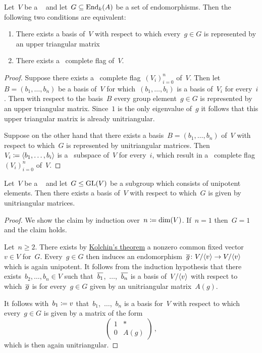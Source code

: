 \begin{lemma}
  Let~$V$ be a {\fd}~{\kvs} and let~$G \subseteq \operatorname{End}_k(A)$ be a set of endomorphisms. 
  Then the following two conditions are equivalent:
  \begin{enumerate}
    \item 
      There exists a basis of~$V$ with respect to which every~$g \in G$ is represented by an upper triangular matrix 
    \item
      There exists a~ complete flag of~$V$.
  \end{enumerate} 
\end{lemma}


\begin{proof}
  Suppose there exists a~ complete flag~$(V_i)_{i=0}^n$ of~$V$.
  Then let~$B = (b_1, \dotsc, b_n)$ be a basis of~$V$ for which~$(b_1, \dotsc, b_i)$ is a basis of~$V_i$ for every~$i$.
  Then with respect to the basis~$B$ every group element~$g \in G$ is represented by an upper triangular matrix.
  Since~$1$ is the only eigenvalue of~$g$ it follows that this upper triangular matrix is already unitriangular.
  
  Suppose on the other hand that there exists a basis~$B = (b_1, \dotsc, b_n)$ of~$V$ with respect to which~$G$ is represented by unitriangular matrices.
  Then~$V_i \coloneqq \langle b_1, \dotsc, b_i\rangle$ is a~ subspace of~$V$ for every~$i$, which result in a~ complete flag~$(V_i)_{i=0}^n$ of~$V$.
\end{proof}


\begin{corollary}[Kolchin]
  \label{kolchin triang}
  Let~$V$ be a {\fd}~{\kvs} and let~$G \leq \operatorname{GL}(V)$ be a subgroup which consists of unipotent elements.
  Then there exists a basis of~$V$ with respect to which~$G$ is given by unitriangular matrices.
\end{corollary}


\begin{proof}
  We show the claim by induction over~$n \coloneqq \dim(V)$.
  If~$n = 1$ then~$G = 1$ and the claim holds.
  
  Let~$n \geq 2$.
  There exists by \hyperref[kolchin fixed vector]{Kolchin’s theorem} a nonzero common fixed vector~$v \in V$ for~$G$.
  Every~$g \in G$ then induces an endomorphism~$\overline{g} \colon V/\langle v\rangle \to V/\langle v\rangle$ which is again unipotent.
  It follows from the induction hypothesis that there exists~$b_2, \dotsc, b_n \in V$ such that~$\overline{b_1}$,~$\dotsc$,~$\overline{b_n}$ is a basis of~$V/\langle v\rangle$ with respect to which~$\overline{g}$ is for every~$g \in G$ given by an unitriangular matrix~$A(g)$.
  
  It follows with~$b_1 \coloneqq v$ that~$b_1$,~$\dotsc$,~$b_n$ is a basis for~$V$ with respect to which every~$g \in G$ is given by a matrix of the form
  \[
    \begin{pmatrix}
      1 & *     \\
      0 & A(g)
    \end{pmatrix} \,,
  \]
  which is then again unitriangular.
\end{proof}


